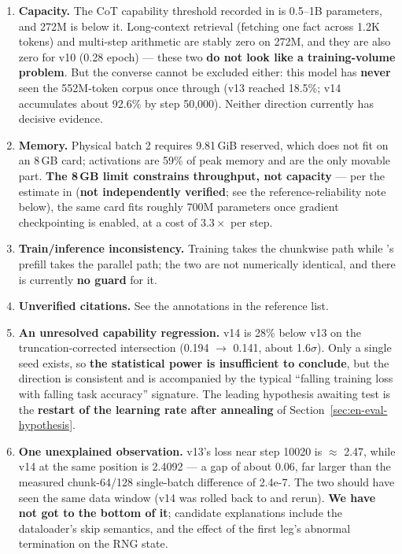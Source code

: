\begin{enumerate}
\item \textbf{Capacity.} The CoT capability threshold recorded in  is 0.5--1B
      parameters, and 272M is below it. Long-context retrieval (fetching one fact across
      1.2K tokens) and multi-step arithmetic are stably zero on 272M, and they are also zero
      for v10 (0.28 epoch) --- these two \textbf{do not look like a training-volume problem}.
      But the converse cannot be excluded either: this model has \textbf{never} seen the
      552M-token corpus once through (v13 reached 18.5\%; v14 accumulates about 92.6\% by step
      50,000). Neither direction currently has decisive evidence.
\item \textbf{Memory.} Physical batch 2 requires 9.81\,GiB reserved, which does not fit on an
      8\,GB card; activations are 59\% of peak memory and are the only movable part.
      \textbf{The 8\,GB limit constrains throughput, not capacity} --- per the estimate in
       (\textbf{not independently verified}; see the reference-reliability note
      below), the same card fits roughly 700M parameters once gradient checkpointing is
      enabled, at a cost of $3.3\times$ per step.
\item \textbf{Train/inference inconsistency.} Training takes the chunkwise path while
      's prefill takes the parallel path; the two are not numerically
      identical, and there is currently \textbf{no guard} for it.
\item \textbf{Unverified citations.} See the annotations in the reference list.
\item \textbf{An unresolved capability regression.} v14 is 28\% below v13 on the
      truncation-corrected intersection (0.194 $\rightarrow$ 0.141, about 1.6$\sigma$). Only a
      single seed exists, so \textbf{the statistical power is insufficient to conclude}, but
      the direction is consistent and is accompanied by the typical ``falling training loss
      with falling task accuracy'' signature. The leading hypothesis awaiting test is the
      \textbf{restart of the learning rate after annealing} of
      Section~\ref{sec:en-eval-hypothesis}.
\item \textbf{One unexplained observation.} v13's loss near step 10020 is $\approx$ 2.47,
      while v14 at the same position is 2.4092 --- a gap of about 0.06, far larger than the
      measured chunk-64/128 single-batch difference of 2.4e-7. The two should have seen the
      same data window (v14 was rolled back to  and rerun).
      \textbf{We have not got to the bottom of it}; candidate explanations include the
      dataloader's skip semantics, and the effect of the first leg's abnormal termination on
      the RNG state.
\end{enumerate}

